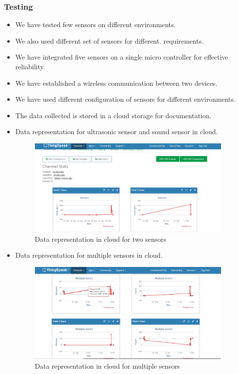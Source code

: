 \documentclass{beamer}
\begin{document}
\begin{frame}\frametitle{Testing}
\begin{itemize}
\item We have tested few sensors on different environments.
\item We also used different set of sensors for different. requirements.  
\end{itemize}
\end{frame}
\begin{frame}
\begin{itemize}\frametitle{Results}
\item We have integrated five sensors on a single micro controller for effective reliability. 
\item We have established a wireless communication between two devices.
\item We have used different configuration of sensors for different environments.
\item The data collected is stored in a cloud storage for documentation.
\end{itemize} 
\end{frame}
\begin{frame}
\begin{itemize}
\item Data representation for ultrasonic sensor and sound sensor in cloud.
  \begin{figure}[H]
  \centerline{\includegraphics[width=4.0in]{01.JPG}}
  \caption{ \textbf{}Data representation in cloud for two sensors}
  \end{figure}
\end{itemize}
\end{frame}
\begin{frame}
\begin{itemize}
\item Data representation for multiple sensors in cloud.
  \begin{figure}
  \centerline{\includegraphics[width=4.0in]{22.JPG}}
  \caption{ \textbf{}Data representation in cloud for multiple sensors}
  \end{figure}
\end{itemize}
\end{frame}
\end{document}
